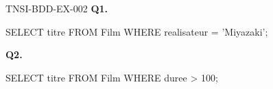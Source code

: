 \begin{corrige}{TNSI-BDD-EX-002}
\textbf{Q1.}
\begin{sql}
SELECT titre FROM Film WHERE realisateur = 'Miyazaki';
\end{sql}

\textbf{Q2.}
\begin{sql}
SELECT titre FROM Film WHERE duree > 100;
\end{sql}
\end{corrige}
